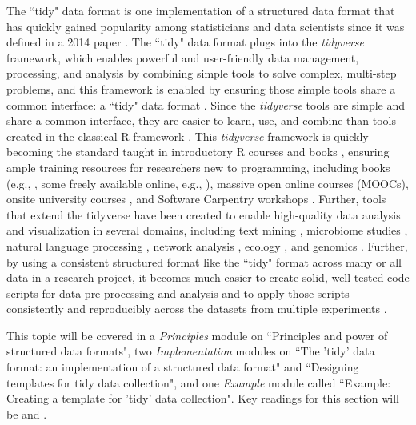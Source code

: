 \documentclass[pdftex,english,11pt,parskip=half]{scrartcl}
\begin{document}
The ``tidy" data format is one implementation of a structured data format that has quickly gained popularity among statisticians and data scientists since it was defined in a 2014 paper \cite{wickham2014tidy}. The ``tidy" data
format plugs into the \textit{tidyverse} framework, which enables powerful and
user-friendly data management, processing, and analysis by combining simple
tools to solve complex, multi-step problems, and this framework is enabled by
ensuring those simple tools share a common interface: a ``tidy" data format
\cite{ross2017declutter, silge2016tidytext, wickham2016ggplot2, wickham2016r}. Since the \textit{tidyverse} tools are simple and share a
common interface, they are easier to learn, use, and combine than tools created
in the classical R framework \cite{ross2017declutter, lowndes2017our,
reviewer2017review, mcnamara2016state}. This \textit{tidyverse} framework is
quickly becoming the standard taught in introductory R courses and books
\cite{hicks2017guide, baumer2015data, kaplan2017teaching, stander2017enthusing,
reviewer2017review, mcnamara2016state}, ensuring ample training resources for
researchers new to programming, including books (e.g., \cite{baumer2017modern,
lifesciencesR}, some freely available online, e.g., \cite{wickham2016r}),
massive open online courses (MOOCs), onsite university courses
\cite{baumer2015data, kaplan2017teaching, stander2017enthusing}, and Software
Carpentry workshops \cite{wilson2014software, pawlik2017developing}. Further,
tools that extend the tidyverse have been created to enable high-quality data
analysis and visualization in several domains, including text mining
\cite{silge2017text}, microbiome studies \cite{mcmurdie2013phyloseq}, natural
language processing \cite{RJ-2017-035}, network analysis \cite{RJ-2017-023},
ecology \cite{hsieh2016inext}, and genomics \cite{yin2012ggbio}. Further, by using a consistent structured format like the ``tidy" format across many or all data in a research project, it becomes much easier to create solid, well-tested code scripts for data pre-processing and analysis and to apply those scripts consistently and reproducibly across the datasets from multiple experiments \cite{broman2018data}.

This topic will
be covered in a \textit{Principles} module on ``Principles and power of
structured data formats", two \textit{Implementation} modules on ``The 'tidy'
data format: an implementation of a structured data format" and ``Designing
templates for tidy data collection", and one \textit{Example} module called
``Example: Creating a template for 'tidy' data collection". Key readings for this section will be \cite{broman2018data} and \cite{wickham2014tidy}. 
\end{document}
